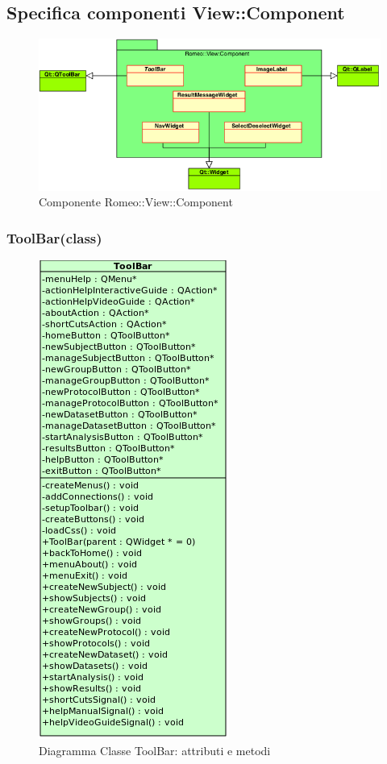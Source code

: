 \color{black}
\subsection{Specifica componenti View::Component}
\label{specificaCompon}
\begin{figure}[!h]

			\includegraphics[width=\linewidth]{../Specifica_Tecnica/Content/Immagini/Romeo__View__Component.png}
			\caption{Componente Romeo::View::Component}
			\label{comp_romeo::view::component}
\end{figure}
\pagebreak
\subsubsection{ToolBar(class)}
\label{spetool}
\begin{figure}[!h]
\centering
			\includegraphics[width=0.4\linewidth]{./Content/Immagini/view/ToolBar.png}
			\caption{Diagramma Classe ToolBar: attributi e metodi}
			\label{cl_tool}
\end{figure}
